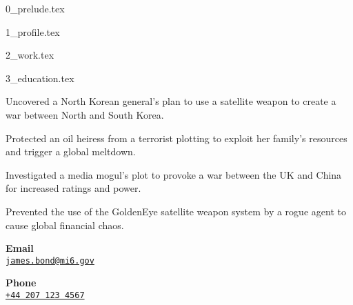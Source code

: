 \documentclass{article}
\begin{document}
{0_prelude.tex}

{1_profile.tex}

{2_work.tex}

{3_education.tex}




\begin{cvevent}[2002]
    Uncovered a North Korean general's plan to use a satellite weapon to create a war between North and South Korea.
\end{cvevent}

\cvseparator[2]
\begin{cvevent}[1999]
    Protected an oil heiress from a terrorist plotting to exploit her family's resources and trigger a global meltdown.
\end{cvevent}

\cvseparator[2]
\begin{cvevent}[1997]
    Investigated a media mogul's plot to provoke a war between the UK and China for increased ratings and power.
\end{cvevent}

\cvseparator[2]
\begin{cvevent}[1995]
    Prevented the use of the GoldenEye satellite weapon system by a rogue agent to cause global financial chaos.
\end{cvevent}


\cvsidebar %



\begin{cvitem}[Envelope][4]
    \textbf{Email}\\
    \href{mailto:james.bond@mi6.gov}{\texttt{james.bond@mi6.gov}}
\end{cvitem}

\cvseparator[3]
\begin{cvitem}[Phone][4]
    \textbf{Phone}\\
    \href{tel:+442071234567}{\texttt{+44 207 123 4567}}
\end{cvitem}
\end{document}
